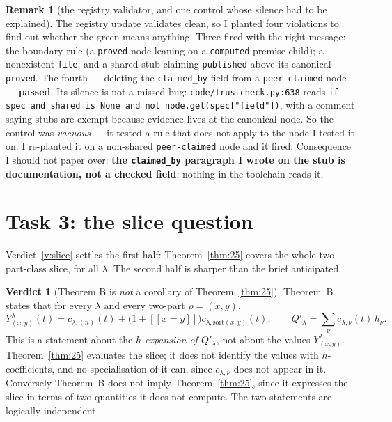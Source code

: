 \documentclass[11pt]{article}
\theoremstyle{definition}
\newtheorem{remark}[theorem]{Remark}
\newtheorem{verdict}[theorem]{Verdict}
\newcommand{\lam}{\lambda}
\newcommand{\Qp}{Q'}
\newcommand{\lb}{[\![}
\newcommand{\rb}{]\!]}
\begin{document}
\begin{remark}[the registry validator, and one control whose silence had to be explained]
\label{rem:validator}
The registry update validates clean, so I planted four violations to find out whether the green
means anything. Three fired with the right message: the boundary rule (a \texttt{proved} node
leaning on a \texttt{computed} premise child); a nonexistent \texttt{file}; and a shared stub
claiming \texttt{published} above its canonical \texttt{proved}. The fourth --- deleting the
\texttt{claimed\_by} field from a \texttt{peer-claimed} node --- \textbf{passed}. Its silence is
not a missed bug: \texttt{code/trustcheck.py:638} reads
\texttt{if spec and shared is None and not node.get(spec["field"])}, with a comment saying stubs
are exempt because evidence lives at the canonical node. So the control was \emph{vacuous} --- it
tested a rule that does not apply to the node I tested it on. I re-planted it on a non-shared
\texttt{peer-claimed} node and it fired. Consequence I should not paper over:
\textbf{the \texttt{claimed\_by} paragraph I wrote on the stub is documentation, not a checked
field}; nothing in the toolchain reads it.
\end{remark}

\section{Task 3: the slice question}\label{sec:slice}

Verdict~\ref{v:slice} settles the first half: Theorem~\ref{thm:25} covers the whole two-part-class
slice, for all $\lam$. The second half is sharper than the brief anticipated.

\begin{verdict}[Theorem B is \emph{not} a corollary of Theorem~\ref{thm:25}]
Theorem~B states that for every $\lam$ and every two-part $\rho=(x,y)$,
\[
  Y^{\lam}_{(x,y)}(t)=c_{\lam,(n)}(t)+\bigl(1+\lb x=y\rb\bigr)c_{\lam,\mathrm{sort}(x,y)}(t),
  \qquad \Qp_\lam=\sum_\nu c_{\lam,\nu}(t)\,h_\nu .
\]
This is a statement about the \emph{$h$-expansion of $\Qp_\lam$}, not about the values
$Y^\lam_{(x,y)}$. Theorem~\ref{thm:25} evaluates the slice; it does not identify the values with
$h$-coefficients, and no specialisation of it can, since $c_{\lam,\nu}$ does not appear in it.
Conversely Theorem~B does not imply Theorem~\ref{thm:25}, since it expresses the slice in terms of
two quantities it does not compute. The two statements are logically independent.
\end{verdict}
\end{document}
